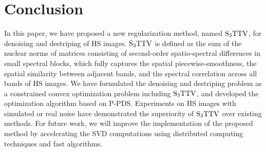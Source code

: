 \section{Conclusion}
\label{sec:conclusion}
In this paper, we have proposed a new regularization method, named ${\text{S}_{3} \text{TTV}}$, for denoising and destriping of HS images. ${\text{S}_{3} \text{TTV}}$ is defined as the sum of the nuclear norms of matrices consisting of second-order spatio-spectral differences in small spectral blocks, which fully captures the spatial piecewise-smoothness, the spatial similarity between adjacent bands, and the spectral correlation across all bands of HS images. We have formulated the denoising and destriping problem as a constrained convex optimization problem including ${\text{S}_{3} \text{TTV}}$, and developed the optimization algorithm based on P-PDS. Experiments on HS images with simulated or real noise have demonstrated the superiority of ${\text{S}_{3} \text{TTV}}$ over existing methods. For future work, we will improve the implementation of the proposed method by accelerating the SVD computations using distributed computing techniques and fast algorithms.